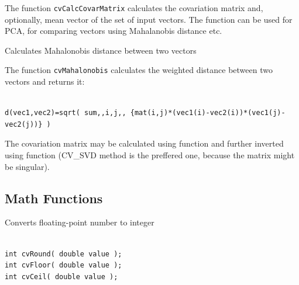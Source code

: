 The function \texttt{cvCalcCovarMatrix} calculates the covariation matrix
and, optionally, mean vector of the set of input vectors. The function
can be used for PCA, for comparing vectors using Mahalanobis distance etc.

\label{Mahalonobis}

Calculates Mahalonobis distance between two vectors


\begin{description}
\end{description}


The function \texttt{cvMahalonobis} calculates the weighted distance between two vectors and returns it:

\begin{lstlisting}

d(vec1,vec2)=sqrt( sum,,i,j,, {mat(i,j)*(vec1(i)-vec2(i))*(vec1(j)-vec2(j))} )

\end{lstlisting}

The covariation matrix may be calculated using  function and further inverted using  function (CV\_SVD method is the preffered one, because the matrix might be singular).


\subsection{Math Functions}

\label{Round, Floor, Ceil}

Converts floating-point number to integer

\begin{lstlisting}

int cvRound( double value );
int cvFloor( double value );
int cvCeil( double value );

\end{lstlisting}

\begin{description}
\end{description}


